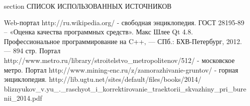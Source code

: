 \newpage
{} {section} {СПИСОК ИСПОЛЬЗОВАННЫХ ИСТОЧНИКОВ}

\begin{thebibliography}{99}
   Web-портал http://ru.wikipedia.org/ - свободная энциклопедия.
   ГОСТ 28195-89 – «Оценка качества программных средств».
   Макс Шлее Qt 4.8. Профессиональное программирование на C++, — СПб.: БХВ-Петербург, 2012. — 894 стр.
   Портал http://www.metro.ru/library/stroitelstvo\_metropolitenov/512/ - московское метро.
   Портал http://www.mining-enc.ru/z/zamorazhivanie-gruntov/ - горная энциклопедия.
   http://lib.ugtu.net/sites/default/files/books/2014/ \\
  bliznyukov\_v.yu\_.\_raschyot\_i\_korrektirovanie\_traektorii\_skvazhiny\_pri\_burenii\_2014.pdf
\end{thebibliography}
